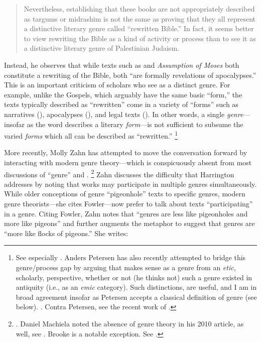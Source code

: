 \begin{quote}
    Nevertheless, establishing that these books are not appropriately described as targums or midrashim is not the same as proving that they all represent a distinctive literary genre called ``rewritten Bible.'' In fact, it seems better to view rewriting the Bible as a kind of activity or process than to see it as a distinctive literary genre of Palestinian Judaism.%
    \autocite[242--243]{harrington_kraft-nickelsburg1986}
\end{quote} 
\noindent
Instead, he observes that while texts such as \jub and \emph{Assumption of Moses} both constitute a rewriting of the Bible, both ``are formally revelations of apocalypses.''%
    \autocite[243]{harrington_kraft-nickelsburg1986}
This is an important criticism of scholars who see \rwb as a distinct genre. For example, unlike the Gospels, which arguably have the same basic ``form,'' the texts typically described as ``rewritten'' come in a variety of ``forms'' such as narratives (\ga), apocalypses (\jub), and legal texts (\templescroll). In other words, a single \emph{genre}---insofar as the word describes a literary \emph{form}---is not sufficient to subsume the varied \emph{forms} which all can be described as ``rewritten.''%
    \footnote{%
        See especially 
        \cite{fraade_goldstein-etal2017}. Anders Petersen has also recently attempted to bridge this genre/process gap by arguing that \rwb makes sense as a genre from an \emph{etic}, scholarly, perspective, whether or not (he thinks not) such a genre existed in antiquity (i.e., as an \emph{emic} category). Such distinctions, are useful, and I am in broad agreement insofar as Petersen accepts a classical definition of genre (see below). 
        \cite{petersen_hilhorst-puech2007}. 
        Contra Petersen, see the recent work of 
        \cite{tino_jsj2018}.}

More recently, Molly Zahn has attempted to move the conversation forward by interacting with modern genre theory---which is conspicuously absent from most discussions of ``genre'' and \rwb.%
    \footnote{%
        \Cite{zahn_jbl2012}. Daniel Machiela noted the absence of genre theory in his 2010 article, as well, see 
        \cite{machiela_jjs2010}. Brooke is a notable exception. See 
        \cite{brooke_dsd2010}.}
Zahn discusses the difficulty that Harrington addresses by noting that works may participate in multiple genres simultaneously. While older conceptions of genre ``pigeonhole'' texts to specific genres, modern genre theorists---she cites Fowler---now prefer to talk about texts ``participating'' in a genre. Citing Fowler, Zahn notes that ``genres are less like pigeonholes and more like pigeons'' and further augments the metaphor to suggest that genres are ``more like flocks of pigeons.'' She writes: 

